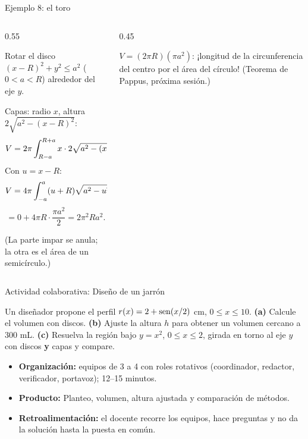 \documentclass[10pt,aspectratio=169]{beamer}
\begin{document}
\begin{frame}{Ejemplo 8: el toro}
  \begin{columns}
    \begin{column}{0.55\textwidth}
      \begin{ejemplo}
        Rotar el disco $(x-R)^2+y^2\le a^2$ ($0<a<R$) alrededor del eje $y$.

        Capas: radio $x$, altura $2\sqrt{a^2-(x-R)^2}$:
        \[ V=2\pi\int_{R-a}^{R+a}x\cdot2\sqrt{a^2-(x-R)^2}\,dx. \]
        Con $u=x-R$:
        \[ V=4\pi\int_{-a}^a(u+R)\sqrt{a^2-u^2}\,du \]
        \[ =0+4\pi R\cdot\frac{\pi a^2}{2}=2\pi^2Ra^2. \]
      \end{ejemplo}
      \small (La parte impar se anula; la otra es el área de un semicírculo.)
    \end{column}
    \begin{column}{0.45\textwidth}
      \centering

      \small $V=(2\pi R)(\pi a^2)$: ¡longitud de la circunferencia del centro por el área del círculo!
      (Teorema de Pappus, próxima sesión.)
    \end{column}
  \end{columns}
\end{frame}

\begin{frame}{Actividad colaborativa: Diseño de un jarrón}
  \small
  \begin{activa}
    Un diseñador propone el perfil $r(x)=2+\operatorname{sen}(x/2)$ cm, $0\le x\le10$. \textbf{(a)} Calcule el volumen con discos. \textbf{(b)} Ajuste la altura $h$ para obtener un volumen cercano a 300 mL. \textbf{(c)} Resuelva la región bajo $y=x^2$, $0\le x\le2$, girada en torno al eje $y$ con discos \textbf{y} capas y compare.
  \end{activa}
  \begin{itemize}
    \item \textbf{Organización:} equipos de 3 a 4 con roles rotativos (coordinador, redactor, verificador, portavoz); 12--15 minutos.
    \item \textbf{Producto:} Planteo, volumen, altura ajustada y comparación de métodos.
    \item \textbf{Retroalimentación:} el docente recorre los equipos, hace preguntas y no da la solución hasta la puesta en común.
  \end{itemize}
\end{frame}
\end{document}
